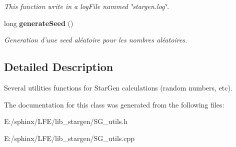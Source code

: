 \begin{CompactItemize}
\begin{CompactList}\small\item\em This function write in a log\-File nammed \char`\"{}stargen.log\char`\"{}. \item\end{CompactList}\item 
long {\bf generate\-Seed} ()\label{class_s_g___utils_e6}

\begin{CompactList}\small\item\em Generation d'une seed al\'{e}atoire pour les nombres al\'{e}atoires. \item\end{CompactList}\end{CompactItemize}


\subsection{Detailed Description}
Several utilities functions for Star\-Gen calculations (random numbers, etc). 



The documentation for this class was generated from the following files:\begin{CompactItemize}
\item 
E:/sphinx/LFE/lib\_\-stargen/SG\_\-utils.h\item 
E:/sphinx/LFE/lib\_\-stargen/SG\_\-utils.cpp\end{CompactItemize}
